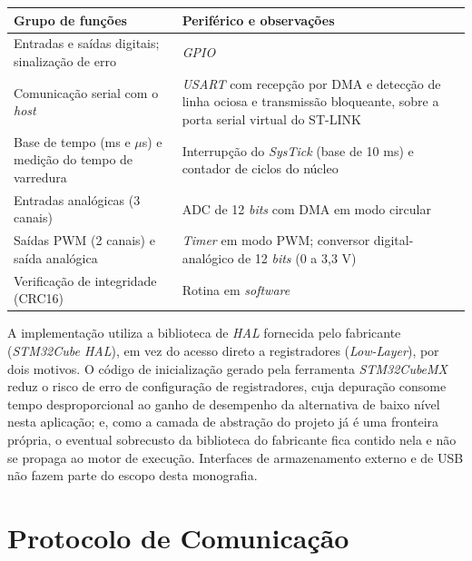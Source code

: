 \begin{quadrofixo}
    \centering
    \begin{tabular}{|p{5.6cm}|p{8.6cm}|}
        \hline
        Grupo de funções & Periférico e observações \\
        \hline
        Entradas e saídas digitais; sinalização de erro & \textit{GPIO} \\
        \hline
        Comunicação serial com o \textit{host} & \textit{USART} com recepção por DMA e detecção de linha ociosa e transmissão bloqueante, sobre a porta serial virtual do ST-LINK \\
        \hline
        Base de tempo (ms e $\mu$s) e medição do tempo de varredura & Interrupção do \textit{SysTick} (base de 10 ms) e contador de ciclos do núcleo \\
        \hline
        Entradas analógicas (3 canais) & ADC de 12 \textit{bits} com DMA em modo circular \\
        \hline
        Saídas PWM (2 canais) e saída analógica & \textit{Timer} em modo PWM; conversor digital-analógico de 12 \textit{bits} (0 a 3,3 V) \\
        \hline
        Verificação de integridade (CRC16) & Rotina em \textit{software} \\
        \hline
    \end{tabular}

    \label{qua:hal}
\end{quadrofixo}

A implementação utiliza a biblioteca de \textit{HAL} fornecida pelo fabricante (\textit{STM32Cube HAL}), em vez do acesso direto a registradores (\textit{Low-Layer}), por dois motivos.
O código de inicialização gerado pela ferramenta \textit{STM32CubeMX} reduz o risco de erro de configuração de registradores, cuja depuração consome tempo desproporcional ao ganho de desempenho da alternativa de baixo nível nesta aplicação; e, como a camada de abstração do projeto já é uma fronteira própria, o eventual sobrecusto da biblioteca do fabricante fica contido nela e não se propaga ao motor de execução.
Interfaces de armazenamento externo e de USB não fazem parte do escopo desta monografia.


\section{Protocolo de Comunicação}
\label{sec:protocolo}

